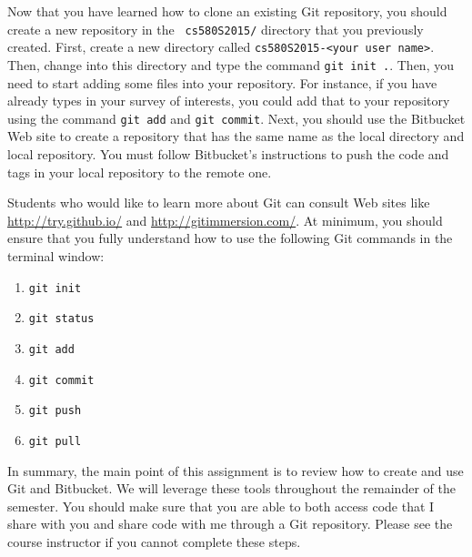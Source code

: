 
Now that you have learned how to clone an existing Git repository, you should create a new repository in the {\tt
cs580S2015/} directory that you previously created.  First, create a new directory called {\tt cs580S2015-<your user
name>}. Then, change into this directory and type the command {\tt git init .}. Then, you need to start adding some
files into your repository. For instance, if you have already types in your survey of interests, you could add that to
your repository using the command {\tt git add} and {\tt git commit}.  Next, you should use the Bitbucket Web site to
create a repository that has the same name as the local directory and local repository.  You must follow Bitbucket's
instructions to push the code and tags in your local repository to the remote one.

Students who would like to learn more about Git can consult Web sites like \url{http://try.github.io/} and
\url{http://gitimmersion.com/}.  At minimum, you should ensure that you fully understand how to use the following Git
commands in the terminal window:

\begin{enumerate}

        \item {\tt git init}

        \item {\tt git status}

        \item {\tt git add}

        \item {\tt git commit}

        \item {\tt git push}

        \item {\tt git pull}

\end{enumerate}

In summary, the main point of this assignment is to review how to create and use Git and Bitbucket. We will leverage
these tools throughout the remainder of the semester.  You should make sure that you are able to both access code that I
share with you and share code with me through a Git repository. Please see the course instructor if you cannot complete
these steps.



